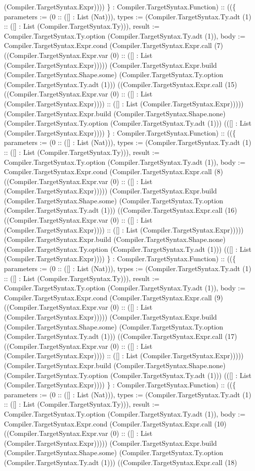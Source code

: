 \documentclass[11pt]{article}
\begin{document}
(Compiler.TargetSyntax.Expr)))) \} : Compiler.TargetSyntax.Function) :: ((\{ parameters := (0 :: ([] : List (Nat))), types := (Compiler.TargetSyntax.Ty.adt (1) :: ([] : List (Compiler.TargetSyntax.Ty))), result := Compiler.TargetSyntax.Ty.option (Compiler.TargetSyntax.Ty.adt (1)), body := Compiler.TargetSyntax.Expr.cond (Compiler.TargetSyntax.Expr.call (7) ((Compiler.TargetSyntax.Expr.var (0) :: ([] : List (Compiler.TargetSyntax.Expr))))) (Compiler.TargetSyntax.Expr.build (Compiler.TargetSyntax.Shape.some) (Compiler.TargetSyntax.Ty.option (Compiler.TargetSyntax.Ty.adt (1))) ((Compiler.TargetSyntax.Expr.call (15) ((Compiler.TargetSyntax.Expr.var (0) :: ([] : List (Compiler.TargetSyntax.Expr)))) :: ([] : List (Compiler.TargetSyntax.Expr))))) (Compiler.TargetSyntax.Expr.build (Compiler.TargetSyntax.Shape.none) (Compiler.TargetSyntax.Ty.option (Compiler.TargetSyntax.Ty.adt (1))) (([] : List (Compiler.TargetSyntax.Expr)))) \} : Compiler.TargetSyntax.Function) :: ((\{ parameters := (0 :: ([] : List (Nat))), types := (Compiler.TargetSyntax.Ty.adt (1) :: ([] : List (Compiler.TargetSyntax.Ty))), result := Compiler.TargetSyntax.Ty.option (Compiler.TargetSyntax.Ty.adt (1)), body := Compiler.TargetSyntax.Expr.cond (Compiler.TargetSyntax.Expr.call (8) ((Compiler.TargetSyntax.Expr.var (0) :: ([] : List (Compiler.TargetSyntax.Expr))))) (Compiler.TargetSyntax.Expr.build (Compiler.TargetSyntax.Shape.some) (Compiler.TargetSyntax.Ty.option (Compiler.TargetSyntax.Ty.adt (1))) ((Compiler.TargetSyntax.Expr.call (16) ((Compiler.TargetSyntax.Expr.var (0) :: ([] : List (Compiler.TargetSyntax.Expr)))) :: ([] : List (Compiler.TargetSyntax.Expr))))) (Compiler.TargetSyntax.Expr.build (Compiler.TargetSyntax.Shape.none) (Compiler.TargetSyntax.Ty.option (Compiler.TargetSyntax.Ty.adt (1))) (([] : List (Compiler.TargetSyntax.Expr)))) \} : Compiler.TargetSyntax.Function) :: ((\{ parameters := (0 :: ([] : List (Nat))), types := (Compiler.TargetSyntax.Ty.adt (1) :: ([] : List (Compiler.TargetSyntax.Ty))), result := Compiler.TargetSyntax.Ty.option (Compiler.TargetSyntax.Ty.adt (1)), body := Compiler.TargetSyntax.Expr.cond (Compiler.TargetSyntax.Expr.call (9) ((Compiler.TargetSyntax.Expr.var (0) :: ([] : List (Compiler.TargetSyntax.Expr))))) (Compiler.TargetSyntax.Expr.build (Compiler.TargetSyntax.Shape.some) (Compiler.TargetSyntax.Ty.option (Compiler.TargetSyntax.Ty.adt (1))) ((Compiler.TargetSyntax.Expr.call (17) ((Compiler.TargetSyntax.Expr.var (0) :: ([] : List (Compiler.TargetSyntax.Expr)))) :: ([] : List (Compiler.TargetSyntax.Expr))))) (Compiler.TargetSyntax.Expr.build (Compiler.TargetSyntax.Shape.none) (Compiler.TargetSyntax.Ty.option (Compiler.TargetSyntax.Ty.adt (1))) (([] : List (Compiler.TargetSyntax.Expr)))) \} : Compiler.TargetSyntax.Function) :: ((\{ parameters := (0 :: ([] : List (Nat))), types := (Compiler.TargetSyntax.Ty.adt (1) :: ([] : List (Compiler.TargetSyntax.Ty))), result := Compiler.TargetSyntax.Ty.option (Compiler.TargetSyntax.Ty.adt (1)), body := Compiler.TargetSyntax.Expr.cond (Compiler.TargetSyntax.Expr.call (10) ((Compiler.TargetSyntax.Expr.var (0) :: ([] : List (Compiler.TargetSyntax.Expr))))) (Compiler.TargetSyntax.Expr.build (Compiler.TargetSyntax.Shape.some) (Compiler.TargetSyntax.Ty.option (Compiler.TargetSyntax.Ty.adt (1))) ((Compiler.TargetSyntax.Expr.call (18) 
\end{document}
